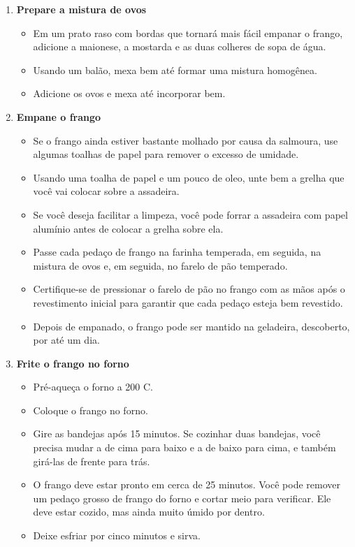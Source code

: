 \documentclass [11pt, papel de carta] {article}
\begin{document}
\begin {description}
\begin {enumerate}
\item {\bf Prepare a mistura de ovos}
\begin {itemize}
\item Em um prato raso com bordas que tornará mais fácil empanar o frango, adicione a maionese, a mostarda e as duas colheres de sopa de água.
\item Usando um bal\~ao, mexa bem até formar uma mistura homogênea.
\item Adicione os ovos e mexa até incorporar bem.
\end {itemize}
\item {\bf Empane o frango}
\begin {itemize}
\item Se o frango ainda estiver bastante molhado por causa da salmoura, use algumas toalhas de papel para remover o excesso de umidade.
\item Usando uma toalha de papel e um pouco de oleo, unte bem a grelha que você vai colocar sobre a assadeira.
\item Se você deseja facilitar a limpeza, você pode forrar a assadeira com papel alumínio antes de colocar a grelha sobre ela.
\item Passe cada pedaço de frango na farinha temperada, em seguida, na mistura de ovos e, em seguida, no farelo de pão temperado.
\item Certifique-se de pressionar o farelo de pão no frango com as mãos após o revestimento inicial para garantir que cada pedaço esteja bem revestido.
\item Depois de empanado, o frango pode ser mantido na geladeira, descoberto, por até um dia.
\end {itemize}
\item {\bf Frite o frango no forno}
\begin {itemize}
\item Pré-aqueça o forno a 200 C.
\item Coloque o frango no forno.
\item Gire as bandejas após 15 minutos. Se cozinhar duas bandejas, você precisa mudar a de cima para baixo e a de baixo para cima, e também girá-las de frente para tr\'as.
\item O frango deve estar pronto em cerca de 25 minutos. Você pode remover um pedaço grosso de frango do forno e cortar meio para verificar. Ele deve estar cozido, mas ainda muito úmido por dentro.
\item Deixe esfriar por cinco minutos e sirva.
\end {itemize}
      \end {enumerate}
\end {description}
\end{document}
